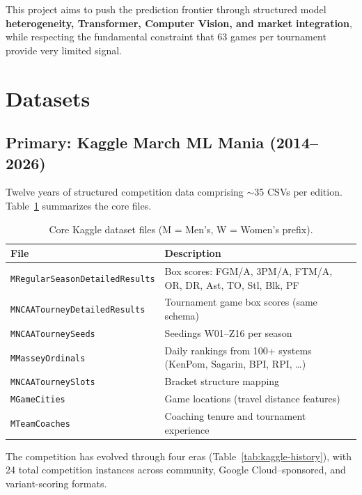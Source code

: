 \documentclass[11pt,a4paper]{article}
\begin{document}
This project aims to push the prediction frontier through structured model \textbf{heterogeneity, Transformer, Computer Vision, and market integration}, while respecting the fundamental constraint that 63 games per tournament provide very limited signal.


\section{Datasets}

\subsection{Primary: Kaggle March ML Mania (2014--2026)}

Twelve years of structured competition data comprising $\sim$35 CSVs per edition. Table~\ref{tab:kaggle-data} summarizes the core files.

\begin{table}[h]
\centering
\caption{Core Kaggle dataset files (M = Men's, W = Women's prefix).}
\label{tab:kaggle-data}
\small
\begin{tabular}{@{}lp{9cm}@{}}
\toprule
\textbf{File} & \textbf{Description} \\
\midrule
\texttt{MRegularSeasonDetailedResults} & Box scores: FGM/A, 3PM/A, FTM/A, OR, DR, Ast, TO, Stl, Blk, PF \\
\texttt{MNCAATourneyDetailedResults} & Tournament game box scores (same schema) \\
\texttt{MNCAATourneySeeds} & Seedings W01--Z16 per season \\
\texttt{MMasseyOrdinals} & Daily rankings from 100+ systems (KenPom, Sagarin, BPI, RPI, \ldots) \\
\texttt{MNCAATourneySlots} & Bracket structure mapping \\
\texttt{MGameCities} & Game locations (travel distance features) \\
\texttt{MTeamCoaches} & Coaching tenure and tournament experience \\
\bottomrule
\end{tabular}
\end{table}

The competition has evolved through four eras (Table~\ref{tab:kaggle-history}), with 24 total competition instances across community, Google Cloud--sponsored, and variant-scoring formats.
\end{document}
